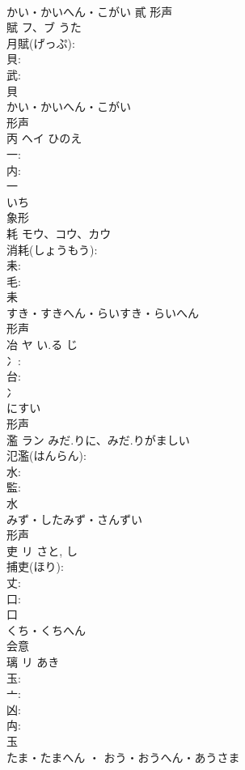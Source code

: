 \documentclass[8pt]{extreport}
\begin{document}
\begin{CJK}{UTF8}{min}
\\	かい・かいへん・こがい	貳	形声 
\\	賦	フ、ブ		うた	
\\	月賦(げっぷ): 
\\	貝: 
\\	武: 
\\	貝	
\\	かい・かいへん・こがい	
\\	形声 
\\	丙	ヘイ	ひのえ		
\\	一: 
\\	内: 
\\	一	
\\	いち	
\\	象形 
\\	耗	モウ、コウ、カウ			
\\	消耗(しょうもう): 
\\	耒: 
\\	毛: 
\\	耒	
\\	すき・すきへん・らいすき・らいへん	
\\	形声 
\\	冶	ヤ	い.る	じ	
\\	冫: 
\\	台: 
\\	冫	
\\	にすい	
\\	形声 
\\	濫	ラン	みだ.りに、みだ.りがましい		
\\	氾濫(はんらん): 
\\	水: 
\\	監: 
\\	水	
\\	みず・したみず・さんずい	
\\	形声 
\\	吏	リ		さと, し	
\\	捕吏(ほり): 
\\	丈: 
\\	口: 
\\	口	
\\	くち・くちへん	
\\	会意 
\\	璃	リ		あき	
\\	玉: 
\\	亠: 
\\	凶: 
\\	禸: 
\\	玉	
\\	たま・たまへん ・ おう・おうへん・あうさま	

\end{CJK}
\end{document}

